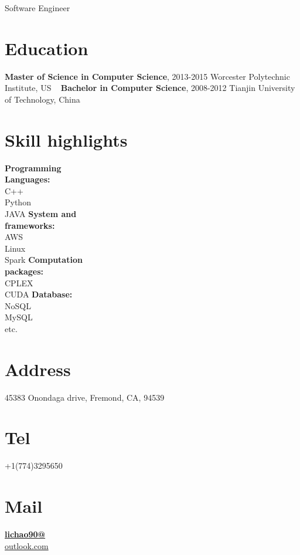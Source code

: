 \documentclass[]{friggeri-cv}
\begin{document}
{Software Engineer}


\begin{aside}
	\section{Education}
	\textbf{Master of Science in 
	Computer Science}, 
	2013-2015
	Worcester Polytechnic 
	Institute, US
	~
	\textbf{Bachelor in 
	Computer Science}, 
	2008-2012
	Tianjin University of 
	Technology, China
	\section{Skill highlights}
	\textbf{Programming \\Languages:} \\ C++\\Python\\ JAVA
	\textbf{System and \\frameworks:} \\AWS\\ Linux\\ Spark 
	\textbf{Computation \\packages:} \\CPLEX\\ CUDA
	\textbf{Database:} \\NoSQL\\ MySQL\\ etc.
	~
	\section{Address}
	45383 Onondaga drive,
	Fremond, CA, 94539
	\section{Tel}
	+1(774)3295650
	\section{Mail}
	\href{mailto:lichao90@outlook.com}{\textbf{lichao90@}\\outlook.com}
	~

\end{aside}
\end{document}
